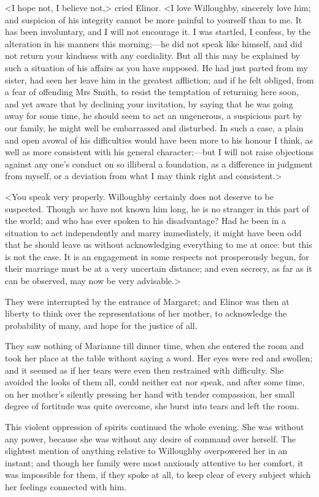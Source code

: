 <I hope not, I believe not,> cried Elinor. <I love Willoughby, sincerely love him; and suspicion of his integrity cannot be more painful to yourself than to me. It has been involuntary, and I will not encourage it. I was startled, I confess, by the alteration in his manners this morning;—he did not speak like himself, and did not return your kindness with any cordiality. But all this may be explained by such a situation of his affairs as you have supposed. He had just parted from my sister, had seen her leave him in the greatest affliction; and if he felt obliged, from a fear of offending Mrs Smith, to resist the temptation of returning here soon, and yet aware that by declining your invitation, by saying that he was going away for some time, he should seem to act an ungenerous, a suspicious part by our family, he might well be embarrassed and disturbed. In such a case, a plain and open avowal of his difficulties would have been more to his honour I think, as well as more consistent with his general character;—but I will not raise objections against any one's conduct on so illiberal a foundation, as a difference in judgment from myself, or a deviation from what I may think right and consistent.>

<You speak very properly. Willoughby certainly does not deserve to be suspected. Though \textit{we} have not known him long, he is no stranger in this part of the world; and who has ever spoken to his disadvantage? Had he been in a situation to act independently and marry immediately, it might have been odd that he should leave us without acknowledging everything to me at once: but this is not the case. It is an engagement in some respects not prosperously begun, for their marriage must be at a very uncertain distance; and even secrecy, as far as it can be observed, may now be very advisable.>

They were interrupted by the entrance of Margaret; and Elinor was then at liberty to think over the representations of her mother, to acknowledge the probability of many, and hope for the justice of all.

They saw nothing of Marianne till dinner time, when she entered the room and took her place at the table without saying a word. Her eyes were red and swollen; and it seemed as if her tears were even then restrained with difficulty. She avoided the looks of them all, could neither eat nor speak, and after some time, on her mother's silently pressing her hand with tender compassion, her small degree of fortitude was quite overcome, she burst into tears and left the room.

This violent oppression of spirits continued the whole evening. She was without any power, because she was without any desire of command over herself. The slightest mention of anything relative to Willoughby overpowered her in an instant; and though her family were most anxiously attentive to her comfort, it was impossible for them, if they spoke at all, to keep clear of every subject which her feelings connected with him.